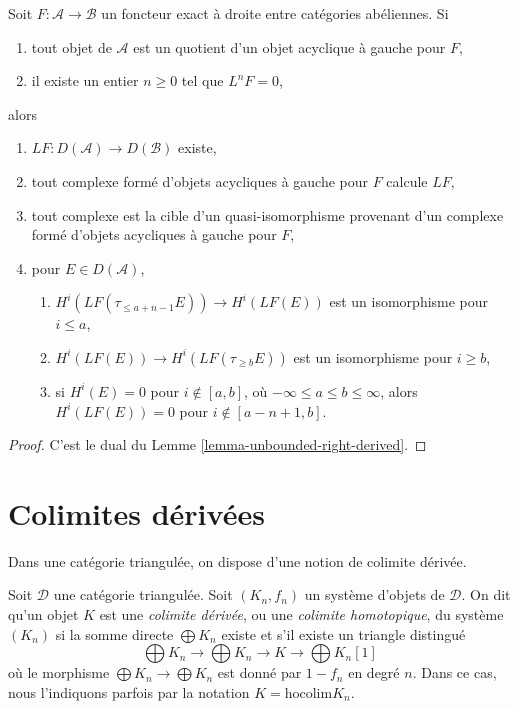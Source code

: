 \begin{lemma}
\label{lemma-unbounded-left-derived}
Soit $F : \mathcal{A} \to \mathcal{B}$ un foncteur exact à droite entre
catégories abéliennes. Si
\begin{enumerate}
\item tout objet de $\mathcal{A}$ est un quotient d'un objet acyclique à
gauche pour $F$,
\item il existe un entier $n \geq 0$ tel que $L^nF = 0$,
\end{enumerate}
alors
\begin{enumerate}
\item $LF : D(\mathcal{A}) \to D(\mathcal{B})$ existe,
\item tout complexe formé d'objets acycliques à gauche pour $F$ calcule $LF$,
\item tout complexe est la cible d'un quasi-isomorphisme provenant d'un
complexe formé d'objets acycliques à gauche pour $F$,
\item pour $E \in D(\mathcal{A})$,
\begin{enumerate}
\item $H^i(LF(\tau_{\leq a + n - 1}E)) \to H^i(LF(E))$ est un isomorphisme
pour $i \leq a$,
\item $H^i(LF(E)) \to H^i(LF(\tau_{\geq b}E))$ est un isomorphisme
pour $i \geq b$,
\item si $H^i(E) = 0$ pour $i \not \in [a, b]$, où
$-\infty \leq a \leq b \leq \infty$, alors $H^i(LF(E)) = 0$
pour $i \not \in [a - n + 1, b]$.
\end{enumerate}
\end{enumerate}
\end{lemma}

\begin{proof}
C'est le dual du Lemme \ref{lemma-unbounded-right-derived}.
\end{proof}

\section{Colimites dérivées}
\label{section-derived-colimit}

\noindent
Dans une catégorie triangulée, on dispose d'une notion de colimite dérivée.

\begin{definition}
\label{definition-derived-colimit}
Soit $\mathcal{D}$ une catégorie triangulée.
Soit $(K_n, f_n)$ un système d'objets de $\mathcal{D}$.
On dit qu'un objet $K$ est une {\it colimite dérivée}, ou une
{\it colimite homotopique}, du système $(K_n)$ si la somme directe
$\bigoplus K_n$ existe et s'il existe un triangle distingué
$$
\bigoplus K_n \to \bigoplus K_n \to K \to \bigoplus K_n[1]
$$
où le morphisme $\bigoplus K_n \to \bigoplus K_n$ est donné par
$1 - f_n$ en degré $n$. Dans ce cas, nous l'indiquons parfois par la notation
$K = \text{hocolim} K_n$.
\end{definition}

